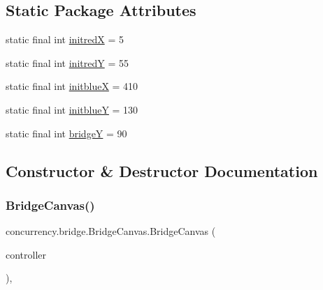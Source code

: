 \subsection*{Static Package Attributes}
\begin{DoxyCompactItemize}
\item 
static final int \mbox{\hyperlink{classconcurrency_1_1bridge_1_1_bridge_canvas_a0fd57d2f7899991524b141fdbd64e4f9}{initredX}} = 5
\item 
static final int \mbox{\hyperlink{classconcurrency_1_1bridge_1_1_bridge_canvas_a116ddc62a00b1a3b726c73036b25b121}{initredY}} = 55
\item 
static final int \mbox{\hyperlink{classconcurrency_1_1bridge_1_1_bridge_canvas_a7e103fbded63455304609b40b6e5458c}{initblueX}} = 410
\item 
static final int \mbox{\hyperlink{classconcurrency_1_1bridge_1_1_bridge_canvas_a8cd98ed2b254d9f99152833053f1d85c}{initblueY}} = 130
\item 
static final int \mbox{\hyperlink{classconcurrency_1_1bridge_1_1_bridge_canvas_acf28c3801b04a1ddf864888e06d0cc4a}{bridgeY}} = 90
\end{DoxyCompactItemize}


\subsection{Constructor \& Destructor Documentation}
\mbox{\label{classconcurrency_1_1bridge_1_1_bridge_canvas_ad6be71b4c4f47474857fa7ab12ff2eae}} 
\subsubsection{\texorpdfstring{Bridge\+Canvas()}{BridgeCanvas()}}
{\footnotesize\ttfamily concurrency.\+bridge.\+Bridge\+Canvas.\+Bridge\+Canvas (\begin{DoxyParamCaption}\item[{\mbox{\hyperlink{classconcurrency_1_1bridge_1_1_single_lane_bridge}{Single\+Lane\+Bridge}}}]{controller }\end{DoxyParamCaption})\hspace{0.3cm}{\ttfamily [inline]}, {\ttfamily [package]}}


